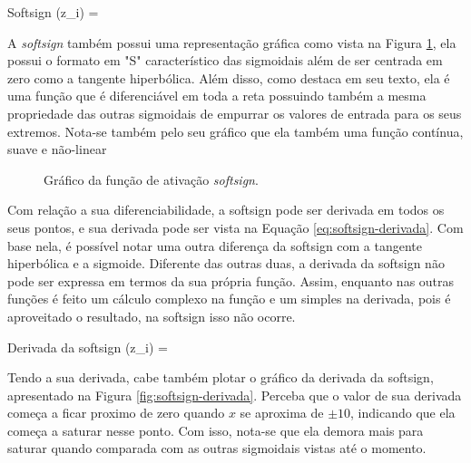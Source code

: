 \begin{equacaodestaque}{Softsign}
    (z_i) = 
    \label{eq:softsign}
\end{equacaodestaque}

A \textit{softsign} também possui uma representação gráfica como vista na Figura \ref{fig:softsign}, ela possui o formato em "S" característico das sigmoidais além de ser centrada em zero como a tangente hiperbólica. Além disso, como \textcite{Softsign1998} destaca em seu texto, ela é uma função que é diferenciável em toda a reta possuindo também a mesma propriedade das outras sigmoidais de empurrar os valores de entrada para os seus extremos. Nota-se também pelo seu gráfico que ela também uma função contínua, suave e não-linear

\begin{figure}[h!]
    \centering
    \caption{Gráfico da função de ativação \textit{softsign}.}
    \label{fig:softsign}
\end{figure}

Com relação a sua diferenciabilidade, a softsign pode ser derivada em todos os seus pontos, e sua derivada pode ser vista na Equação \ref{eq:softsign-derivada}. Com base nela, é possível notar uma outra diferença da softsign com a tangente hiperbólica e a sigmoide. Diferente das outras duas, a derivada da softsign não pode ser expressa em termos da sua própria função. Assim, enquanto nas outras funções é feito um cálculo complexo na função e um simples na derivada, pois é aproveitado o resultado, na softsign isso não ocorre.

\begin{equacaodestaque}{Derivada da softsign}
    (z_i) = 
    \label{eq:softsign-derivada}
\end{equacaodestaque}

Tendo a sua derivada, cabe também plotar o gráfico da derivada da softsign, apresentado na Figura \ref{fig:softsign-derivada}. Perceba que o valor de sua derivada começa a ficar proximo de zero quando $x$ se aproxima de $\pm 10$, indicando que ela começa a saturar nesse ponto. Com isso, nota-se que ela demora mais para saturar quando comparada com as outras sigmoidais vistas até o momento.


